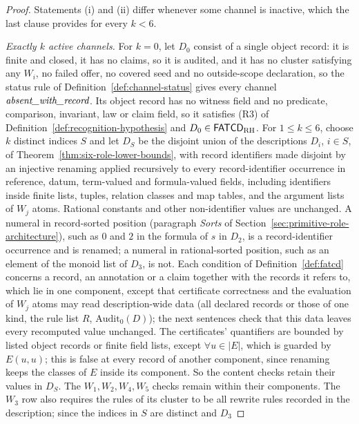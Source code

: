 \begin{proof}
Statements (i) and (ii) differ whenever some channel is inactive, which the
last clause provides for every \(k<6\). \par\emph{Exactly \(k\) active channels.} For \(k=0\), let \(D_0\) consist of a
single object record: it is finite and closed, it has no claims, so it is
audited, and it has no cluster satisfying any \(W_i\), no failed offer, no
covered seed and no outside-scope declaration, so the status rule of
Definition~\ref{def:channel-status} gives every channel \(\textit{absent\_\allowbreak with\_\allowbreak record}\). Its
object record has no witness field and no predicate, comparison, invariant,
law or claim field, so it satisfies (R3) of
Definition~\ref{def:recognition-hypothesis} and
\(D_0\in\mathsf{FATCD}_{\mathrm{RH}}\). For
\(1\le k\le 6\), choose \(k\) distinct indices \(S\) and let \(D_S\) be the
disjoint union of the descriptions \(D_i\), \(i\in S\), of
Theorem~\ref{thm:six-role-lower-bounds}, with record identifiers made
disjoint by an injective renaming applied recursively to every
record-identifier occurrence in reference, datum, term-valued and
formula-valued fields, including identifiers inside finite lists,
tuples, relation classes and map tables, and the argument lists of
\(W_j\) atoms. Rational constants and other non-identifier values
are unchanged. A numeral in record-sorted position (paragraph \emph{Sorts} of Section~\ref{sec:primitive-role-architecture}), such as \(0\) and \(2\) in the formula of \(s\) in \(D_2\), is a record-identifier occurrence and is renamed; a numeral in rational-sorted position, such as an element of the monoid list of \(D_3\), is not. Each condition of Definition~\ref{def:fatcd} concerns a record, an
annotation or a claim together with the records it refers to, which lie in one component, except that certificate correctness and the evaluation of \(W_j\) atoms may read description-wide data (all declared records or those of one kind, the rule list \(R\), \(\mathrm{Audit}_0(D)\)); the next sentences check that this data leaves every recomputed value unchanged. The certificates' quantifiers are bounded by listed object records or finite field lists, except \(\forall u\in|E|\), which is guarded by \(E(u,u)\); this is false at every record of another component, since renaming keeps the classes of \(E\) inside its component. So the content checks retain their values in \(D_S\). The \(W_1,W_2,W_4,W_5\) checks remain within their components. The
\(W_3\) row also requires the rules of its cluster to be all rewrite rules
recorded in the description; since the indices in \(S\) are distinct and \(D_3\)

\end{proof}
